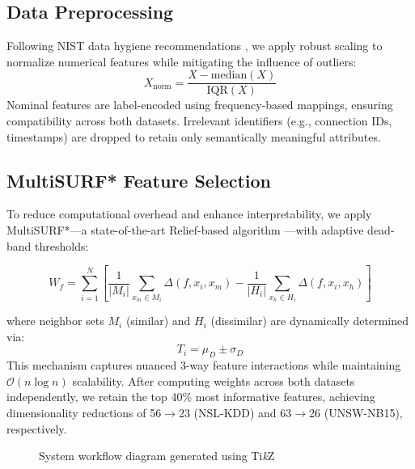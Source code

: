 \documentclass[conference]{IEEEtran}
\begin{document}
\subsection{Data Preprocessing}
Following NIST data hygiene recommendations \cite{nist_framework}, we apply robust scaling to normalize numerical features while mitigating the influence of outliers:
\begin{equation}
X_{\text{norm}} = \frac{X - \text{median}(X)}{\text{IQR}(X)}
\end{equation}
Nominal features are label-encoded using frequency-based mappings, ensuring compatibility across both datasets. Irrelevant identifiers (e.g., connection IDs, timestamps) are dropped to retain only semantically meaningful attributes.

\subsection{MultiSURF* Feature Selection}
To reduce computational overhead and enhance interpretability, we apply MultiSURF*—a state-of-the-art Relief-based algorithm \cite{urbanowicz}—with adaptive dead-band thresholds:
\begin{small}
\begin{equation}
W_f = \sum_{i=1}^N \left[\frac{1}{|M_i|}\sum_{x_m \in M_i}\Delta(f,x_i,x_m) 
- \frac{1}{|H_i|}\sum_{x_h \in H_i}\Delta(f,x_i,x_h)\right]
\label{eq:multisurf}
\end{equation}
\end{small}
where neighbor sets $M_i$ (similar) and $H_i$ (dissimilar) are dynamically determined via:
\begin{equation}
T_i = \mu_D \pm \sigma_D
\end{equation}
This mechanism captures nuanced 3-way feature interactions while maintaining $\mathcal{O}(n\log n)$ scalability. After computing weights across both datasets independently, we retain the top 40\% most informative features, achieving dimensionality reductions of 56$\rightarrow$23 (NSL-KDD) and 63$\rightarrow$26 (UNSW-NB15), respectively.

\begin{figure}[htbp]
\centering
{}
\caption{System workflow diagram generated using Ti\textit{k}Z}
\label{fig:workflow}
\end{figure}
\end{document}
